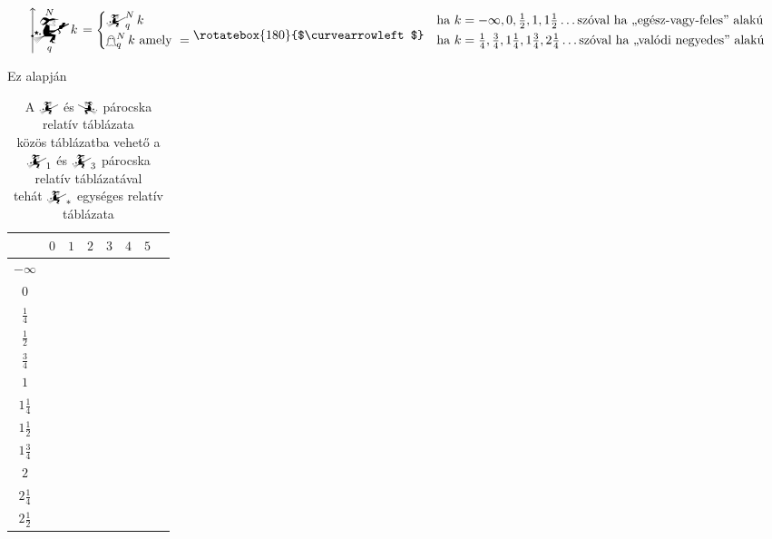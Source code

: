 \documentclass{article}
\newcommand{\blk}{\cellcolor{darkgray}}
\newcommand{\red}{\cellcolor{red!33}}
\newcommand{\grn}{\cellcolor{green!33}}
\newcommand{\ylw}{\cellcolor{yellow}}
\newcommand{\nothing}{\text{\raisebox{0.4em}{\rotatebox{180}{$\curvearrowleft$}}}}%
\newcommand{\just}[1]{\boxed{#1}}%
\newcommand{\incl}{\mathbf{incl}}
\newcommand{\excl}{\mathbf{excl}}
\newcommand{\currymainfun}[1]{\mathwitch_{#1}}
\newcommand{\currymainfunA}{\mathwitch}
\newcommand{\currymainfunB}{\reversemathwitch}
\newcommand{\mainfuncomm}[3]{\mathwitch_{#2}^{#1}#3}
\newcommand{\mainfunext}[3]{\left\uparrow\!\!\!\mathwitch*_{#2}^{#1}#3\right.}
\newcommand{\gbh}[3]{\mathop{\mathghost}^{#1}_{#2}#3}
\begin{document}
	\[
		\mainfunext Nqk =
		\begin{cases}
			\mainfuncomm Nqk & \text{ha } k = -\infty, 0, \frac12, 1, 1\frac12\dots \text{szóval ha ,,egész-vagy-feles'' alakú}\\
			\gbh Nqk \text{ amely } =\nothing & \text{ha } k = \frac14, \frac34, 1\frac14, 1\frac34, 2\frac14\dots \text{szóval ha ,,valódi negyedes'' alakú}
		\end{cases}
	\]

	Ez alapján

	\begin{table}[H]
		\caption*{A $\currymainfunA$ és $\currymainfunB$ párocska relatív táblázata\\közös táblázatba vehető a $\currymainfun1$ és $\currymainfun3$ párocska relatív táblázatával\\tehát $\currymainfun{*}$ egységes relatív táblázata}
		\centering
		\begin{tabular}{c||c|c|c|c|c|c|c|}
				&	$0$		&	$1$		&	$2$		&	$3$		&	$4$		&	$5$		\\\hline\hline
		$-\infty$	&	\nothing	&	\nothing	&	\nothing	&	\nothing	&	\nothing	&	\nothing	\\\hline
			$0$	&	\nothing	&	\nothing	&	\nothing	&	\nothing	&	\nothing	&	\grn\just\incl	\\\hline
		$\frac14$	&	\ylw\nothing	&	\ylw\nothing	&	\ylw\nothing	&	\ylw\nothing	&	\ylw\nothing	&	\ylw\nothing	\\\hline
		$\frac12$	&	\red\just\excl	&	\nothing	&	\nothing	&	\nothing	&	\nothing	&	\grn\just\incl	\\\hline
		$\frac34$	&	\ylw\nothing	&	\ylw\nothing	&	\ylw\nothing	&	\ylw\nothing	&	\ylw\nothing	&	\ylw\nothing	\\\hline
			$1$	&	\red\just\excl	&	\nothing	&	\nothing	&	\nothing	&	\grn\just\incl	&	\blk		\\\hline
		$1\frac14$	&	\ylw\nothing	&	\ylw\nothing	&	\ylw\nothing	&	\ylw\nothing	&	\ylw\nothing	&	\ylw		\\\hline
		$1\frac12$	&	\blk		&	\red\just\excl	&	\nothing	&	\nothing	&	\grn\just\incl	&	\blk		\\\hline
		$1\frac34$	&	\ylw		&	\ylw\nothing	&	\ylw\nothing	&	\ylw\nothing	&	\ylw\nothing	&	\ylw		\\\hline
			$2$	&	\blk		&	\red\just\excl	&	\nothing	&	\grn\just\incl	&	\blk		&	\blk		\\\hline
		$2\frac14$	&	\ylw		&	\ylw\nothing	&	\ylw\nothing	&	\ylw\nothing	&	\ylw		&	\ylw		\\\hline
		$2\frac12$	&	\blk		&	\blk		&	\red\just\excl	&	\grn\just\incl	&	\blk		&	\blk		\\\hline

\end{tabular}
\end{table}
\end{document}
